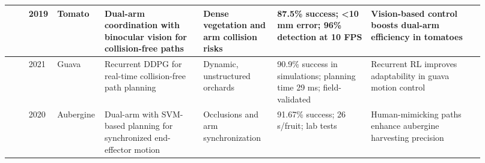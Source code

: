 \documentclass{ieeeaccess}
\begin{document}
\begin{table}[htbp]
\begin{tabular}{p{0.04\linewidth} p{0.04\linewidth} p{0.07\linewidth} p{0.20\linewidth} p{0.15\linewidth} p{0.19\linewidth} p{0.23\linewidth}}
\cite{ling2019dual} & 2019 & Tomato & Dual-arm coordination with binocular vision for collision-free paths & Dense vegetation and arm collision risks & 87.5\% success; <10 mm error; 96\% detection at 10 FPS & Vision-based control boosts dual-arm efficiency in tomatoes \\ \midrule
\cite{lin2021collision} & 2021 & Guava & Recurrent DDPG for real-time collision-free path planning & Dynamic, unstructured orchards & 90.9\% success in simulations; planning time 29 ms; field-validated & Recurrent RL improves adaptability in guava motion control \\ \midrule
\cite{sepulveda2020robotic} & 2020 & Aubergine & Dual-arm with SVM-based planning for synchronized end-effector motion & Occlusions and arm synchronization & 91.67\% success; 26 s/fruit; lab tests & Human-mimicking paths enhance aubergine harvesting precision \\ \midrule


\end{tabular}
\end{table}
\end{document}
